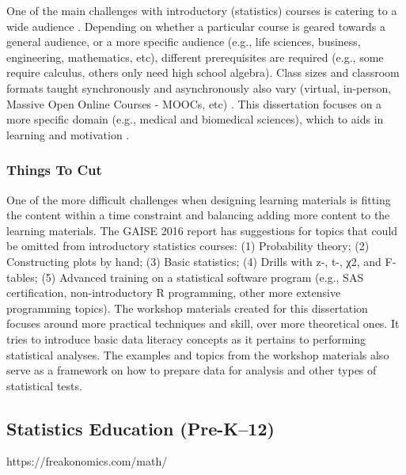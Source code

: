 \documentclass[010-intro.tex]{subfiles}
\begin{document}
    One of the main challenges with introductory (statistics) courses is catering to a wide audience
    \cite{gaise2016}.
    Depending on whether a particular course is geared towards a general audience, or a more specific audience
    (e.g., life sciences, business, engineering, mathematics, etc),
    different prerequisites are required
    (e.g., some require calculus, others only need high school algebra).
    Class sizes and classroom formats taught synchronously and asynchronously also vary
    (virtual, in-person, Massive Open Online Courses - MOOCs, etc)
    \cite{gaise2016}.
    This dissertation focuses on a more specific domain (e.g., medical and biomedical sciences),
    which to aids in learning and motivation
    \cite{ambrose2010learning, wilson2019teaching, krossDemocratizationDataScience2020}.
    
    \subsubsection{Things To Cut}
    
        One of the more difficult challenges when designing learning materials is fitting the content within a time constraint
        and balancing adding more content to the learning materials. %
        The GAISE 2016 report has suggestions for topics that could be omitted from introductory statistics courses:
        (1) Probability theory;
        (2) Constructing plots by hand;
        (3) Basic statistics;
        (4) Drills with z-, t-, χ2, and F-tables;
        (5) Advanced training on a statistical software program
            (e.g., SAS certification, non-introductory R programming, other more extensive programming topics).
        The workshop materials created for this dissertation
        focuses around more practical techniques and skill, over more theoretical ones.
        It tries to introduce basic data literacy concepts as it pertains to performing statistical analyses.
        The examples and topics from the workshop materials
        also serve as a framework on how to prepare data for analysis and other types of statistical tests.
    
\subsection{Statistics Education (Pre-K–12)}

https://freakonomics.com/math/

\cite{gaise2k12}
\end{document}
